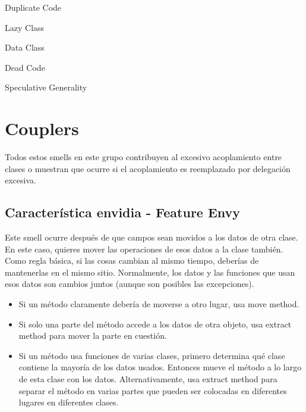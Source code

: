 \documentclass[11pt,a4paper,oneside]{book}
\begin{document}
    Duplicate Code
    
    Lazy Class

    Data Class

Dead Code

    Speculative Generality


\section{Couplers}

Todos estos smells en este grupo contribuyen al excesivo acoplamiento entre clases o muestran que ocurre si el acoplamiento es reemplazado por delegación excesiva. 

\subsection{Característica envidia - Feature Envy}
\label{featureenvy}
Este smell ocurre después de que campos sean movidos a los datos de otra clase. En este caso, quieres mover las operaciones de esos datos a la clase también.
\newline
Como regla básica, si las cosas cambian al mismo tiempo, deberías de mantenerlas en el mismo sitio. Normalmente, los datos y las funciones que usan esos datos son cambios juntos (aunque son posibles las excepciones).
\begin{itemize}
    \item Si un método claramente debería de moverse a otro lugar, usa move method.
    \item Si solo una parte del método accede a los datos de otra objeto, usa extract method para mover la parte en cuestión.
    \item Si un método usa funciones de varias clases, primero determina qué clase contiene la mayoría de los datos usados. Entonces mueve el método a lo largo de esta clase con los datos. Alternativamente, usa extract method para separar el método en varias partes que pueden ser colocadas en diferentes lugares en diferentes clases.
\end{itemize}
\end{document}
